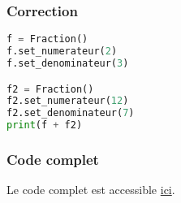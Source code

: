 \documentclass[svgnames,11pt]{beamer}
\begin{document}
\begin{frame}[fragile]
    \frametitle{Correction}

\begin{center}
\begin{lstlisting}[language=Python , basicstyle=\ttfamily\small, xleftmargin=2em, xrightmargin=1em]
f = Fraction()
f.set_numerateur(2)
f.set_denominateur(3)

f2 = Fraction()
f2.set_numerateur(12)
f2.set_denominateur(7)
print(f + f2)
\end{lstlisting}
\label{CODE}
\end{center}

\end{frame}

\begin{frame}
    \frametitle{Code complet}

    Le code complet est accessible \href{https://cviroulaud.github.io/terminale/langages/paradigmes/POO/tp-fraction/scripts/fraction-correction.zip}{ici}.

\end{frame}
\end{document}
